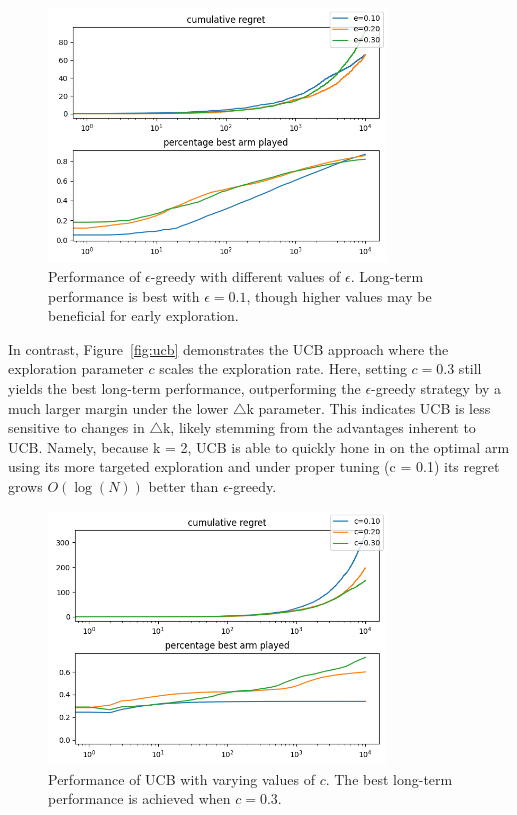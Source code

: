\documentclass[11pt]{article}
\begin{document}
\begin{figure}[htbp]
\centering
\includegraphics[width=0.8\textwidth]{images/Figure_4.png}
\caption{Performance of $\epsilon$-greedy with different values of $\epsilon$. Long-term performance is best with $\epsilon = 0.1$,
though higher values may be beneficial for early exploration.}
\label{fig:epsilon_hard}
\end{figure}

\newpage
In contrast, Figure~\ref{fig:ucb} demonstrates the UCB approach where the exploration parameter $c$ scales the exploration rate.
Here, setting $c = 0.3$ still yields the best long-term performance, outperforming the $\epsilon$-greedy strategy by a much larger margin under the
lower $\bigtriangleup$k parameter. This indicates UCB is less sensitive to changes in $\bigtriangleup$k, likely stemming from the advantages inherent to UCB.
Namely, because k = 2, UCB is able to quickly hone in on the optimal arm using its more targeted exploration and under proper tuning (c = 0.1) its regret
grows $O(\log(N))$ better than $\epsilon$-greedy.

\begin{figure}[htbp]
\centering
\includegraphics[width=0.8\textwidth]{images/Figure_5.png}
\caption{Performance of UCB with varying values of $c$. The best long-term performance is achieved when $c = 0.3$.}
\label{fig:ucb_hard}
\end{figure}
\end{document}
